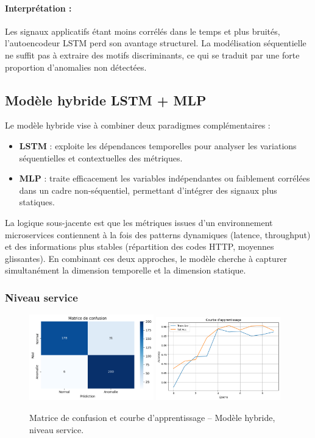 \documentclass[a4paper,12pt]{report}
\begin{document}
\paragraph{Interprétation :}
Les signaux applicatifs étant moins corrélés dans le temps et plus bruités, l’autoencodeur LSTM perd son avantage structurel.  
La modélisation séquentielle ne suffit pas à extraire des motifs discriminants, ce qui se traduit par une forte proportion d’anomalies non détectées.


\subsection{Modèle hybride LSTM + MLP}

Le modèle hybride vise à combiner deux paradigmes complémentaires :
\begin{itemize}
    \item \textbf{LSTM} : exploite les dépendances temporelles pour analyser les variations séquentielles et contextuelles des métriques.
    \item \textbf{MLP} : traite efficacement les variables indépendantes ou faiblement corrélées dans un cadre non-séquentiel, permettant d’intégrer des signaux plus statiques.
\end{itemize}

La logique sous-jacente est que les métriques issues d’un environnement microservices contiennent à la fois des patterns dynamiques (latence, throughput) et des informations plus stables (répartition des codes HTTP, moyennes glissantes). En combinant ces deux approches, le modèle cherche à capturer simultanément la dimension temporelle et la dimension statique.

\subsubsection*{Niveau service}

\begin{figure}[H]
    \centering
    \includegraphics[width=0.48\textwidth]{images/confusion_matrix_hybrid_service.png}
    \includegraphics[width=0.48\textwidth]{images/loss_curve_hybrid_service.png}
    \caption{Matrice de confusion et courbe d’apprentissage – Modèle hybride, niveau service.}
\end{figure}
\end{document}

